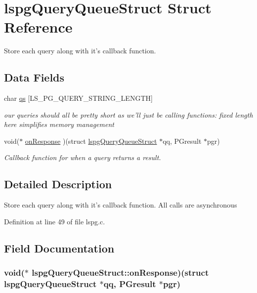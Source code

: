 \hypertarget{structlspgQueryQueueStruct}{
\section{lspgQueryQueueStruct Struct Reference}
\label{structlspgQueryQueueStruct}
}


Store each query along with it's callback function.  
\subsection*{Data Fields}
\begin{DoxyCompactItemize}
\item 
char \hyperlink{structlspgQueryQueueStruct_abf8c9c581b38a5e3e269eda69e47de15}{qs} \mbox{[}LS\_\-PG\_\-QUERY\_\-STRING\_\-LENGTH\mbox{]}
\begin{DoxyCompactList}\small\item\em our queries should all be pretty short as we'll just be calling functions: fixed length here simplifies memory management \item\end{DoxyCompactList}\item 
void($\ast$ \hyperlink{structlspgQueryQueueStruct_a53bac5ae4cab775423940bff5092a831}{onResponse} )(struct \hyperlink{structlspgQueryQueueStruct}{lspgQueryQueueStruct} $\ast$qq, PGresult $\ast$pgr)
\begin{DoxyCompactList}\small\item\em Callback function for when a query returns a result. \item\end{DoxyCompactList}\end{DoxyCompactItemize}


\subsection{Detailed Description}
Store each query along with it's callback function. All calls are asynchronous 

Definition at line 49 of file lspg.c.

\subsection{Field Documentation}
\hypertarget{structlspgQueryQueueStruct_a53bac5ae4cab775423940bff5092a831}{
\subsubsection[{onResponse}]{\setlength{\rightskip}{0pt plus 5cm}void($\ast$ {\bf lspgQueryQueueStruct::onResponse})(struct {\bf lspgQueryQueueStruct} $\ast$qq, PGresult $\ast$pgr)}}
\label{structlspgQueryQueueStruct_a53bac5ae4cab775423940bff5092a831}


